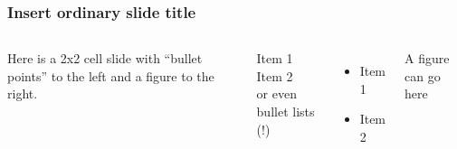 \documentclass{beamer}
\begin{document}
\begin{frame}
\frametitle{Insert ordinary slide title}

\begin{columns}
Here is a 2x2 cell slide with ``bullet points'' to the left and a
figure to the right.



\vspace{3mm}




\vspace{3mm}



Item 1 \\
Item 2 \\

or even bullet lists (!)

\begin{itemize}
 \item Item 1

 \item Item 2
\end{itemize}

\noindent

\begin{center}
\begin{Sbox}
\begin{minipage}{0.85\linewidth}
A figure can go here
\end{minipage}
\end{Sbox}
\fbox{\TheSbox}
\end{center}

\end{columns}
\end{frame}
\end{document}
